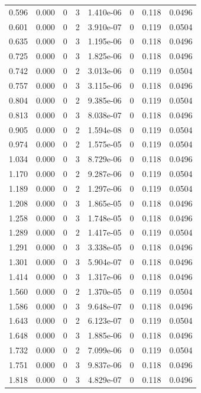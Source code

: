 \documentclass[preview]{standalone}
\begin{document}
{{\begin{tabular}{L{1.2cm}C{1.2cm} C{0.3cm}C{0.5cm} C{1.4cm}C{1.4cm} C{1.4cm}C{1.4cm}}
  0.596  &  0.000  & 0     &  3 &  1.410e-06  & 0  & 0.118 &  0.0496   \\ 
  0.601  &  0.000  & 0     &  2 &  3.910e-07  & 0  & 0.119 &  0.0504   \\ 
  0.635  &  0.000  & 0     &  3 &  1.195e-06  & 0  & 0.118 &  0.0496   \\ 
  0.725  &  0.000  & 0     &  3 &  1.825e-06  & 0  & 0.118 &  0.0496   \\ 
  0.742  &  0.000  & 0     &  2 &  3.013e-06  & 0  & 0.119 &  0.0504   \\ 
  0.757  &  0.000  & 0     &  3 &  3.115e-06  & 0  & 0.118 &  0.0496   \\ 
  0.804  &  0.000  & 0     &  2 &  9.385e-06  & 0  & 0.119 &  0.0504   \\ 
  0.813  &  0.000  & 0     &  3 &  8.038e-07  & 0  & 0.118 &  0.0496   \\ 
  0.905  &  0.000  & 0     &  2 &  1.594e-08  & 0  & 0.119 &  0.0504   \\ 
  0.974  &  0.000  & 0     &  2 &  1.575e-05  & 0  & 0.119 &  0.0504   \\ 
  1.034  &  0.000  & 0     &  3 &  8.729e-06  & 0  & 0.118 &  0.0496   \\ 
  1.170  &  0.000  & 0     &  2 &  9.287e-06  & 0  & 0.119 &  0.0504   \\ 
  1.189  &  0.000  & 0     &  2 &  1.297e-06  & 0  & 0.119 &  0.0504   \\ 
  1.208  &  0.000  & 0     &  3 &  1.865e-05  & 0  & 0.118 &  0.0496   \\ 
  1.258  &  0.000  & 0     &  3 &  1.748e-05  & 0  & 0.118 &  0.0496   \\ 
  1.289  &  0.000  & 0     &  2 &  1.417e-05  & 0  & 0.119 &  0.0504   \\ 
  1.291  &  0.000  & 0     &  3 &  3.338e-05  & 0  & 0.118 &  0.0496   \\ 
  1.301  &  0.000  & 0     &  3 &  5.904e-07  & 0  & 0.118 &  0.0496   \\ 
  1.414  &  0.000  & 0     &  3 &  1.317e-06  & 0  & 0.118 &  0.0496   \\ 
  1.560  &  0.000  & 0     &  2 &  1.370e-05  & 0  & 0.119 &  0.0504   \\ 
  1.586  &  0.000  & 0     &  3 &  9.648e-07  & 0  & 0.118 &  0.0496   \\ 
  1.643  &  0.000  & 0     &  2 &  6.123e-07  & 0  & 0.119 &  0.0504   \\ 
  1.648  &  0.000  & 0     &  3 &  1.885e-06  & 0  & 0.118 &  0.0496   \\ 
  1.732  &  0.000  & 0     &  2 &  7.099e-06  & 0  & 0.119 &  0.0504   \\ 
  1.751  &  0.000  & 0     &  3 &  9.837e-06  & 0  & 0.118 &  0.0496   \\ 
  1.818  &  0.000  & 0     &  3 &  4.829e-07  & 0  & 0.118 &  0.0496   \\ 
\hline 
\end{tabular} 

}}
\end{document}
